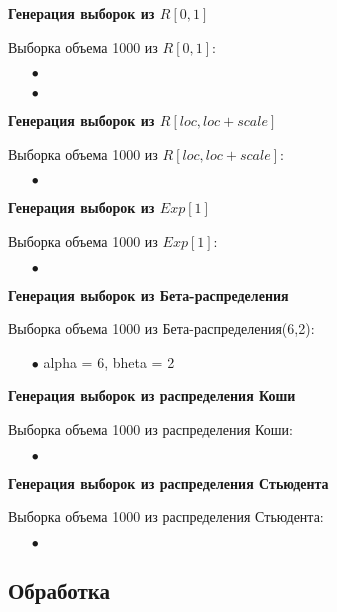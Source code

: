 \textbf{Генерация выборок из $R[0,1]$}

	Выборка объема 1000 из $R[0,1]$:
	\begin{itemize}
		\item[$\bullet$] 
		\item[$\bullet$] 
	\end{itemize}

\textbf{Генерация выборок из $R[loc, loc + scale]$}

	Выборка объема 1000 из $R[loc,loc + scale]$:
	\begin{itemize}
		\item[$\bullet$] 
	\end{itemize}

\textbf{Генерация выборок из $Exp[1]$}

	Выборка объема 1000 из $Exp[1]$:
	\begin{itemize}
		\item[$\bullet$] 
	\end{itemize}

\textbf{Генерация выборок из Бета-распределения}

	Выборка объема 1000 из Бета-распределения(6,2):
	\begin{itemize}
		\item[$\bullet$] alpha = 6, bheta = 2\\
	\end{itemize}

\textbf{Генерация выборок из распределения Коши}

	Выборка объема 1000 из распределения Коши:
	\begin{itemize}
		\item[$\bullet$] 
	\end{itemize}

\textbf{Генерация выборок из распределения Стьюдента}

	Выборка объема 1000 из распределения Стьюдента:
	\begin{itemize}
		\item[$\bullet$] 
	\end{itemize}

\subsection{Обработка}\label{cha:basic/sec:python/subsec:data}

